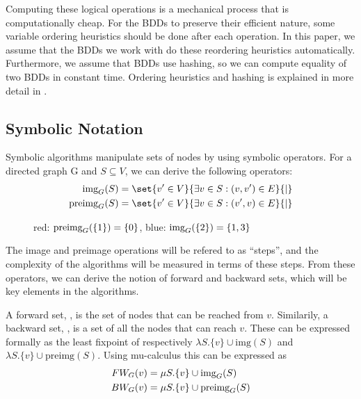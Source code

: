 \documentclass[../master/master.tex]{subfiles}
\begin{document}
Computing these logical operations is a mechanical process that is computationally cheap. For the BDDs to preserve their efficient nature, some variable ordering heuristics should be done after each operation. In this paper, we assume that the BDDs we work with do these reordering heuristics automatically. Furthermore, we assume that BDDs use hashing, so we can compute equality of two BDDs in constant time. Ordering heuristics and hashing is explained in more detail in \cite{bryant_1992}.

\subsection{Symbolic Notation}
Symbolic algorithms manipulate sets of nodes by using symbolic operators. For a directed graph G and $S\subseteq V$, we can derive the following operators: 
\begin{align*}
\img S &= \set{v' \in V}{\exists v\in S:(v, v')\in E}{|}\\
\pre S &= \set{v' \in V}{\exists v\in S:(v', v)\in E}{|}
\end{align*}

\begin{figure}[H]
\center
{}
\caption{red: $\text{preimg}_{G}(\{1\}) = \{0\}$, blue: $\text{img}_{G}(\{2\}) = \{1,3\}$ }
\label{imgpreimg}
\end{figure}

The image and preimage operations will be refered to as ``steps'', and the complexity of the algorithms will be measured in terms of these steps. From these operators, we can derive the notion of forward and backward sets, which will be key elements in the algorithms.

A forward set, , is the set of nodes that can be reached from $v$. Similarily, a backward set, , is a set of all the nodes that can reach $v$. These can be expressed formally as the least fixpoint of respectively $\lambda S.\{v\}\cup \text{img}(S)$ and $\lambda S.\{v\}\cup \text{preimg}(S)$. Using mu-calculus \cite{clarke_peled_grumberg_1999} this can be expressed as 
\begin{align}\label{fw}
FW_{G}(v) &= \mu S.\{v\}\cup \text{img}_G(S)\\
\label{bw}BW_{G}(v) &= \mu S.\{v\}\cup \text{preimg}_G(S)
\end{align}
\end{document}

